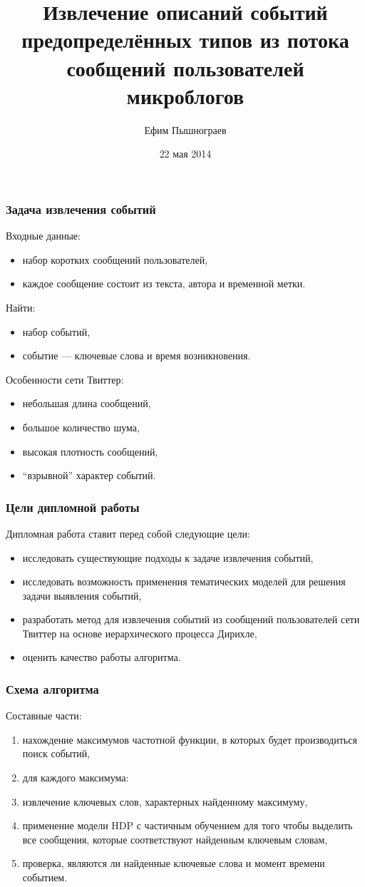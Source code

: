 \documentclass[10pt,pdf,hyperref={unicode}]{beamer}
\author{Ефим Пышнограев}
\date{22 мая 2014}
\institute{Филиал МГУ в городе Севастополе}
\title{Извлечение описаний событий предопределённых типов из потока сообщений пользователей микроблогов}
\begin{document}
\begin{frame}
  \titlepage
\end{frame}

\begin{frame}
 \frametitle{Задача извлечения событий}
 Входные данные:
 \begin{itemize}
 \item набор коротких сообщений пользователей,
 \item каждое сообщение состоит из текста, автора и временной метки.
 \end{itemize}
 Найти:
 \begin{itemize}
 \item набор событий,
 \item событие --- ключевые слова и время возникновения.
 \end{itemize}
 Особенности сети Твиттер:
 \begin{itemize}
 \item небольшая длина сообщений,
 \item большое количество шума,
 \item высокая плотность сообщений,
 \item ``взрывной'' характер событий.
 \end{itemize}
\end{frame}

\begin{frame}
 \frametitle{Цели дипломной работы}
 Дипломная работа ставит перед собой следующие цели:
 \begin{itemize}
 \item исследовать существующие подходы к задаче извлечения событий,
 \item исследовать возможность применения тематических моделей для решения задачи выявления событий,
 \item разработать метод для извлечения событий из сообщений пользователей сети Твиттер на основе иерархического процесса Дирихле,
 \item оценить качество работы алгоритма.
 \end{itemize}	 
\end{frame}

\begin{frame}
  \frametitle{Схема алгоритма}
  Составные части:
  \begin{enumerate}  
  \item нахождение максимумов частотной функции, в которых будет производиться поиск событий,
  \item[] для каждого максимума:
   \item извлечение ключевых слов, характерных найденному максимуму,
   \item применение модели HDP с частичным обучением для того чтобы выделить все сообщения, которые соответствуют найденным ключевым словам,
   \item проверка, являются ли найденные ключевые слова и момент времени событием.
  \end{enumerate}
\end{frame}
\end{document}
